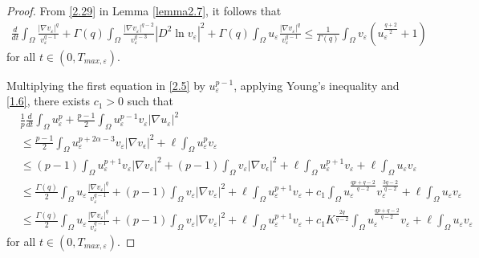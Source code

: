 \documentclass[12pt]{article}
\theoremstyle{plain}
\theoremstyle{definition}
\numberwithin{equation}{section}
\begin{document}
\begin{proof}
From \eqref{2.29} in Lemma \ref{lemma2.7}, it follows that
    \begin{align}\label{3.31}
    \frac{d}{dt}\int_{\Omega}\frac{|\nabla v_{\varepsilon}|^q}{v_{\varepsilon}^{q-1}}+\Gamma(q)\int_{\Omega}\frac{|\nabla
    v_{\varepsilon}|^{q-2}}{v_{\varepsilon}^{q-3}}|D^2\ln{v_{\varepsilon}}|^2+\Gamma(q)\int_{\Omega}u_{\varepsilon}\frac{|\nabla
    v_{\varepsilon}|^q}{v_{\varepsilon}^{q-1}}\leq \frac{1}{\Gamma(q)}\int_{\Omega}v_{\varepsilon}(u_{\varepsilon}^{\frac{q+2}{2}}+1)
\end{align}
for all $t\in (0,T_{max,\varepsilon})$.

  Multiplying the first equation in \eqref{2.5} by $u_{\varepsilon}^{p-1}$, applying Young's inequality and \eqref{1.6}, there exists
  $c_1>0$ such that
    \begin{align}\label{3.32}
      &\frac{1}p \frac{d}{dt}\int_{\Omega}u_{\varepsilon}^{p}+\frac{p-1}{2}\int_{\Omega}u_{\varepsilon}^{p-1}v_{\varepsilon}|\nabla
      u_{\varepsilon}|^2\nonumber
      \\
      &\leq \frac{p-1}{2}\int_{\Omega}u_{\varepsilon}^{p+2\alpha-3}v_{\varepsilon}|\nabla
      v_{\epsilon}|^2+\ell\int_{\Omega}u_{\varepsilon}^pv_{\varepsilon}
      \\
      &\leq (p-1)\int_{\Omega}u_{\varepsilon}^{p+1}v_{\varepsilon}|\nabla v_{\varepsilon}|^2+(p-1)\int_{\Omega}v_{\varepsilon}|\nabla
      v_{\epsilon}|^2+\ell\int_{\Omega}u_{\varepsilon}^{p+1}v_{\varepsilon}+\ell\int_{\Omega}u_{\varepsilon}v_{\varepsilon}\nonumber
      \\
      &\leq  \frac{\Gamma(q)} 2
      \int_{\Omega}u_{\varepsilon}\frac{|\nabla v_{\varepsilon}|^q}{v_{\varepsilon}^{q-1}}+(p-1)\int_{\Omega}v_{\varepsilon}|\nabla
      v_{\varepsilon}|^2+\ell\int_{\Omega}u_{\varepsilon}^{p+1}v_{\varepsilon}+c_1\int_{\Omega}u_{\varepsilon}^{\frac{qp+q-2}{q-2}}v_{\varepsilon}^{\frac{3q-2}{q-2}}+\ell\int_{\Omega}u_{\varepsilon}v_{\varepsilon}\nonumber
      \\
      &\leq    \frac{\Gamma(q)} 2\int_{\Omega}u_{\varepsilon}\frac{|\nabla v_{\varepsilon}|^q}{v_{\varepsilon}^{q-1}}+(p-1)\int_{\Omega}v_{\varepsilon}|\nabla
      v_{\varepsilon}|^2+\ell\int_{\Omega}u_{\varepsilon}^{p+1}v_{\varepsilon}+
      c_1K^{\frac{2q}{q-2}}\int_{\Omega}u_{\varepsilon}^{\frac{qp+q-2}{q-2}}v_{\varepsilon}+
      \ell\int_{\Omega}u_{\varepsilon}v_{\varepsilon}\nonumber
    \end{align}
    for all $t\in (0,T_{max,\varepsilon})$.


\end{proof}
\end{document}
